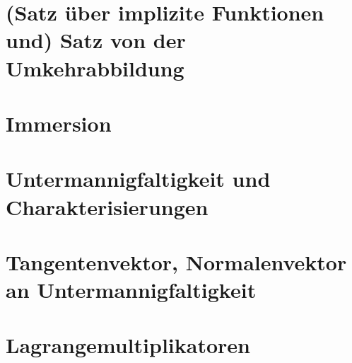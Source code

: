 \section{(Satz \"uber implizite Funktionen und) Satz von der Umkehrabbildung}

\section{Immersion}

\section{Untermannigfaltigkeit und Charakterisierungen}

\section{Tangentenvektor, Normalenvektor an Untermannigfaltigkeit}

\section{Lagrangemultiplikatoren}